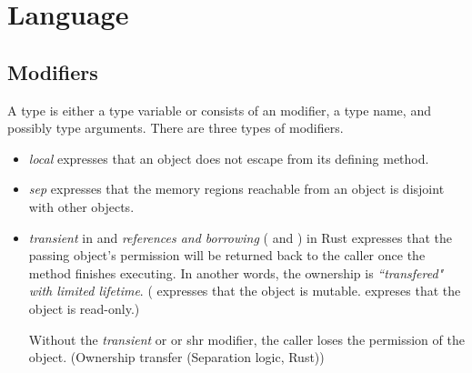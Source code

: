 \section{Language}
\label{sec:language}

\subsection{Modifiers}
A type is either a type variable or consists of an modifier, a type name, and possibly type arguments. There are three types of modifiers.
\begin{itemize}
\item \emph{local} expresses that an object does not escape from its defining method.
\item \emph{sep} expresses that the memory regions reachable from an object is disjoint with other objects.
\item \emph{transient} in \cite{haller2010capabilities} and \emph{references and borrowing} ( and ) in Rust expresses that the passing object's permission will be returned back to the caller once the method finishes executing. In another words, the ownership is \emph{``transfered" with limited lifetime}. ( expresses that the object is mutable.  expreses that the object is read-only.)

Without the \emph{transient} or  or {shr} modifier, the caller loses the permission of the object. (Ownership transfer (Separation logic, Rust))
%
%
%

\end{itemize}

